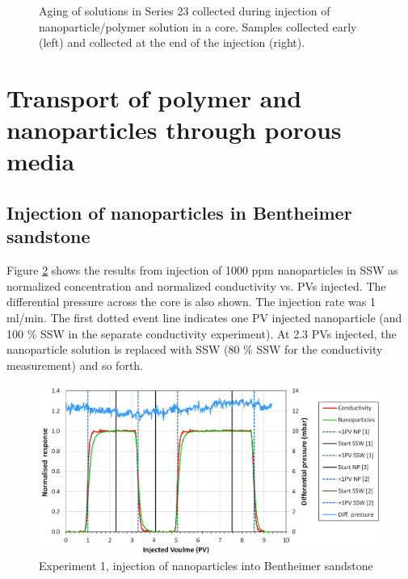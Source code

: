 \begin{figure} 
    \centering
    \caption{Aging of solutions in Series 23 collected during injection of nanoparticle/polymer solution in a core. Samples collected early (left) and collected at the end of the injection (right).}
    \label{cht:s23visc80}
\end{figure}

\section{Transport of polymer and nanoparticles through porous media}
\subsection{Injection of nanoparticles in Bentheimer sandstone}
Figure \ref{cht:injexp1} shows the results from injection of 1000 ppm nanoparticles in SSW as normalized concentration and normalized conductivity vs. PVs injected. The differential pressure across the core is also shown. The injection rate was 1 ml/min. The first dotted event line indicates one PV injected nanoparticle (and 100 \% SSW in the separate conductivity experiment). At 2.3 PVs injected, the nanoparticle solution is replaced with SSW (80 \% SSW for the conductivity measurement) and so forth.

\begin{figure}[h]
    \centering
    \includegraphics[width=\textwidth]{img/cht/injexp1bent.png}
    \caption{Experiment 1, injection of nanoparticles into Bentheimer sandstone}
    \label{cht:injexp1}
\end{figure}

